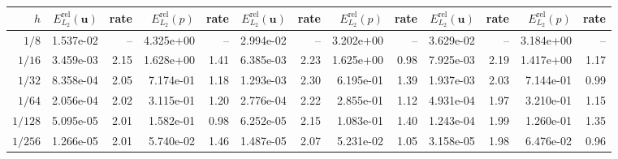 \begin{landscape}
\begin{center}
\begin{tabular}{
r rr rr rr rr rr rr
}
\cmidrule(lr){2-5}\cmidrule(lr){6-9}\cmidrule(lr){10-13}
$h$ & $E_{L_2}^{\mathrm{rel}}(\mathbf{u})$ & rate & $E_{L_2}^{\mathrm{rel}}(p)$ & rate & $E_{L_2}^{\mathrm{rel}}(\mathbf{u})$ & rate & $E_{L_2}^{\mathrm{rel}}(p)$ & rate & $E_{L_2}^{\mathrm{rel}}(\mathbf{u})$ & rate & $E_{L_2}^{\mathrm{rel}}(p)$ & rate \\
\midrule
$1/8$ & 1.537e-02 & -- & 4.325e+00 & -- & 2.994e-02 & -- & 3.202e+00 & -- & 3.629e-02 & -- & 3.184e+00 & -- \\
$1/16$ & 3.459e-03 & 2.15 & 1.628e+00 & 1.41 & 6.385e-03 & 2.23 & 1.625e+00 & 0.98 & 7.925e-03 & 2.19 & 1.417e+00 & 1.17 \\
$1/32$ & 8.358e-04 & 2.05 & 7.174e-01 & 1.18 & 1.293e-03 & 2.30 & 6.195e-01 & 1.39 & 1.937e-03 & 2.03 & 7.144e-01 & 0.99 \\
$1/64$ & 2.056e-04 & 2.02 & 3.115e-01 & 1.20 & 2.776e-04 & 2.22 & 2.855e-01 & 1.12 & 4.931e-04 & 1.97 & 3.210e-01 & 1.15 \\
$1/128$ & 5.095e-05 & 2.01 & 1.582e-01 & 0.98 & 6.252e-05 & 2.15 & 1.083e-01 & 1.40 & 1.243e-04 & 1.99 & 1.260e-01 & 1.35 \\
$1/256$ & 1.266e-05 & 2.01 & 5.740e-02 & 1.46 & 1.487e-05 & 2.07 & 5.231e-02 & 1.05 & 3.158e-05 & 1.98 & 6.476e-02 & 0.96 \\
\bottomrule
\end{tabular}
\end{center}
\vfill
\begin{center}\thepage\end{center}
\clearpage
\end{landscape}
